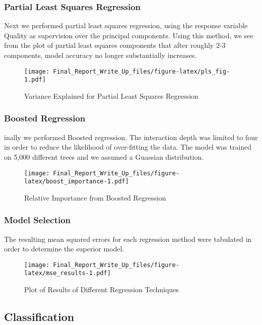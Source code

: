 \documentclass[]{article}
\begin{document}
\subsubsection{Partial Least Squares
Regression}\label{partial-least-squares-regression}

Next we performed partial least squares regression, using the response
variable Quality as supervision over the principal components. Using
this method, we see from the plot of partial least squares components
that after roughly 2-3 components, model accuracy no longer
substantially increases.

\begin{figure}[htbp]
\centering
\texttt{[image: Final\_Report\_Write\_Up\_files/figure-latex/pls\_fig-1.pdf]}
\caption{Variance Explained for Partial Least Squares Regression}
\end{figure}

\subsubsection{Boosted Regression}\label{boosted-regression}

inally we performed Boosted regression. The interaction depth was
limited to four in order to reduce the likelihood of over-fitting the
data. The model was trained on 5,000 different trees and we assumed a
Guassian distribution.

\begin{figure}[H]
\centering
\texttt{[image: Final\_Report\_Write\_Up\_files/figure-latex/boost\_importance-1.pdf]}
\caption{Relative Importance from Boosted Regression}
\end{figure}

\subsubsection{Model Selection}\label{model-selection}

The resulting mean squared errors for each regression method were
tabulated in order to determine the superior model.

\begin{figure}[H]
\centering
\texttt{[image: Final\_Report\_Write\_Up\_files/figure-latex/mse\_results-1.pdf]}
\caption{Plot of Results of Different Regression Techniques}
\end{figure}

\subsection{Classification}\label{classification}
\end{document}
